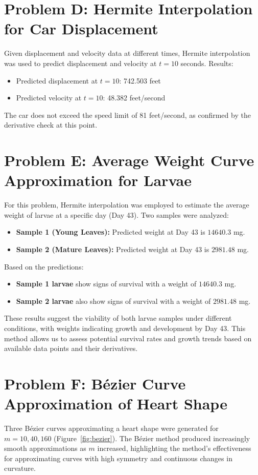 \documentclass[a4paper]{article}
\begin{document}
\section*{Problem D: Hermite Interpolation for Car Displacement}
Given displacement and velocity data at different times, Hermite interpolation was used to predict displacement and velocity at \( t = 10 \) seconds. 
Results:
\begin{itemize}
    \item Predicted displacement at \( t = 10 \): 742.503 feet
    \item Predicted velocity at \( t = 10 \): 48.382 feet/second
\end{itemize}
The car does not exceed the speed limit of 81 feet/second, as confirmed by the derivative check at this point.

\section*{Problem E: Average Weight Curve Approximation for Larvae}
For this problem, Hermite interpolation was employed to estimate the average weight of larvae at a specific day (Day 43). Two samples were analyzed:

\begin{itemize}
    \item \textbf{Sample 1 (Young Leaves):} Predicted weight at Day 43 is \(14640.3\) mg.
    \item \textbf{Sample 2 (Mature Leaves):} Predicted weight at Day 43 is \(2981.48\) mg.
\end{itemize}

Based on the predictions:
\begin{itemize}
    \item \textbf{Sample 1 larvae} show signs of survival with a weight of \(14640.3\) mg.
    \item \textbf{Sample 2 larvae} also show signs of survival with a weight of \(2981.48\) mg.
\end{itemize}

These results suggest the viability of both larvae samples under different conditions, with weights indicating growth and development by Day 43. This method allows us to assess potential survival rates and growth trends based on available data points and their derivatives.

\section*{Problem F: Bézier Curve Approximation of Heart Shape}
Three Bézier curves approximating a heart shape were generated for \( m = 10, 40, 160 \) (Figure~\ref{fig:bezier}).
The Bézier method produced increasingly smooth approximations as \( m \) increased, highlighting the method’s effectiveness for approximating curves with high symmetry and continuous changes in curvature.
\end{document}
